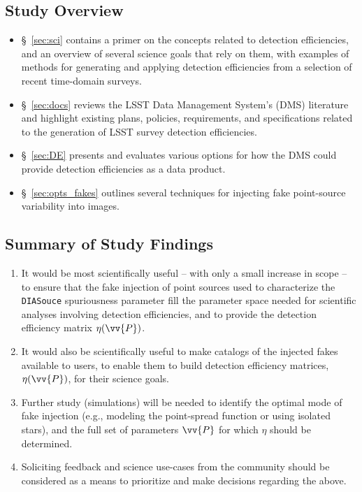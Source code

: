 \documentclass[DM,lsstdraft,toc]{lsstdoc}
\begin{document}
\subsection{Study Overview}
\begin{itemize}
\item \S~\ref{sec:sci} contains a primer on the concepts related to detection efficiencies, and an overview of several science goals that rely on them, with examples of methods for generating and applying detection efficiencies from a selection of recent time-domain surveys. 
\item \S~\ref{sec:docs} reviews the LSST Data Management System's (DMS) literature and highlight existing plans, policies, requirements, and specifications related to the generation of LSST survey detection efficiencies. 
\item \S~\ref{sec:DE} presents and evaluates various options for how the DMS could provide detection efficiencies as a data product. 
\item \S~\ref{sec:opts_fakes} outlines several techniques for injecting fake point-source variability into images.
\end{itemize}

\subsection{Summary of Study Findings}
\begin{enumerate}
\item It would be most scientifically useful -- with only a small increase in scope -- to ensure that the fake injection of point sources used to characterize the {\tt DIASouce} spuriousness parameter fill the parameter space needed for scientific analyses involving detection efficiencies, and to provide the detection efficiency matrix $\eta(\vv{P})$.
\item It would also be scientifically useful to make catalogs of the injected fakes available to users, to enable them to build detection efficiency matrices, $\eta(\vv{P})$, for their science goals.
\item Further study (simulations) will be needed to identify the optimal mode of fake injection (e.g., modeling the point-spread function or using isolated stars), and the full set of parameters $\vv{P}$ for which $\eta$ should be determined.
\item Soliciting feedback and science use-cases from the community should be considered as a means to prioritize and make decisions regarding the above.
\end{enumerate}
\end{document}
